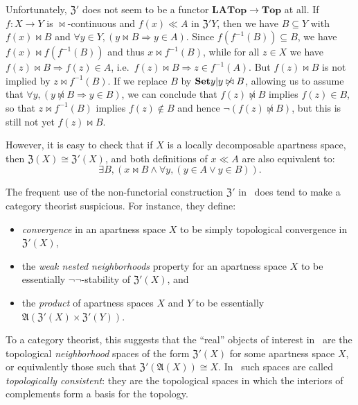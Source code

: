\documentclass{article}
\let\implies\Rightarrow
\def\inv{^{-1}}
\def\anti{\mathfrak{A}}
\def\neigh{\mathfrak{Z}}
\def\nn{\ensuremath{\neg\neg}}
\def\Top{\mathbf{Top}}
\def\LATop{\mathbf{LATop}}
\begin{document}
Unfortunately, $\neigh'$ does not seem to be a functor $\LATop\to \Top$ at all.
If $f:X\to Y$ is $\bowtie$-continuous and $f(x)\ll A$ in $\neigh' Y$, then we have $B\subseteq Y$ with $f(x)\bowtie B$ and $\forall y\in Y, (y\bowtie B \implies y\in A)$.
Since $f(f\inv(B)) \subseteq B$, we have $f(x)\bowtie f(f\inv(B))$ and thus $x\bowtie f\inv(B)$, while for all $z\in X$ we have $f(z)\bowtie B \implies f(z)\in A$, i.e.\ $f(z)\bowtie B \implies z\in f\inv(A)$.
But $f(z)\bowtie B$ is not implied by $z\bowtie f\inv(B)$.
If we replace $B$ by $\setof{y|y\not\bowtie B}$, allowing us to assume that $\forall y, (y\not\bowtie B \implies y\in B)$, we can conclude that $f(z)\not\bowtie B$ implies $f(z)\in B$, so that $z\bowtie f\inv(B)$ implies $f(z) \notin B$ and hence $\neg(f(z)\not\bowtie B)$, but this is still not yet $f(z)\bowtie B$.

However, it is easy to check that if $X$ is a locally decomposable apartness space, then $\neigh(X) \cong \neigh'(X)$, and both definitions of $x\ll A$ are also equivalent to:
\begin{equation}
  \exists B, (x\bowtie B \land \forall y, (y\in A \lor y\in B)).\label{eq:top-bowtie-ll-2}
\end{equation}

\begin{rmk}
  The frequent use of the non-functorial construction $\neigh'$ in~\cite[Chapter 2]{bridges-vita} does tend to make a category theorist suspicious.
  For instance, they define:
  \begin{itemize}
  \item \emph{convergence} in an apartness space $X$ to be simply topological convergence in $\neigh'(X)$,
  \item the \emph{weak nested neighborhoods} property for an apartness space $X$ to be essentially \nn-stability of $\neigh'(X)$, and
  \item the \emph{product} of apartness spaces $X$ and $Y$ to be essentially $\anti(\neigh'(X) \times \neigh'(Y))$.
  \end{itemize}
  To a category theorist, this suggests that the ``real'' objects of interest in~\cite[Chapter 2]{bridges-vita} are the topological \emph{neighborhood} spaces of the form $\neigh'(X)$ for some apartness space $X$, or equivalently those such that $\neigh'(\anti(X))\cong X$.
  In~\cite{bridges-vita} such spaces are called \emph{topologically consistent}: they are the topological spaces in which the interiors of complements form a basis for the topology.
\end{rmk}
\end{document}
